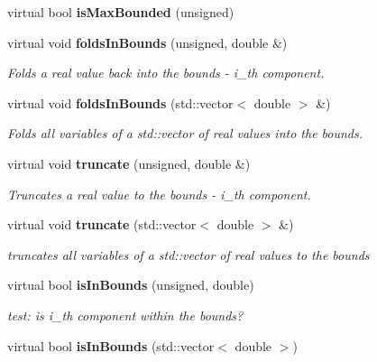 \begin{CompactItemize}
\item 
virtual bool {\bf is\-Max\-Bounded} (unsigned)\label{classeo_real_vector_no_bounds_a7}

\item 
virtual void {\bf folds\-In\-Bounds} (unsigned, double \&)\label{classeo_real_vector_no_bounds_a8}

\begin{CompactList}\small\item\em Folds a real value back into the bounds - i\_\-th component. \item\end{CompactList}\item 
virtual void {\bf folds\-In\-Bounds} (std::vector$<$ double $>$ \&)\label{classeo_real_vector_no_bounds_a9}

\begin{CompactList}\small\item\em Folds all variables of a std::vector of real values into the bounds. \item\end{CompactList}\item 
virtual void {\bf truncate} (unsigned, double \&)\label{classeo_real_vector_no_bounds_a10}

\begin{CompactList}\small\item\em Truncates a real value to the bounds - i\_\-th component. \item\end{CompactList}\item 
virtual void {\bf truncate} (std::vector$<$ double $>$ \&)\label{classeo_real_vector_no_bounds_a11}

\begin{CompactList}\small\item\em truncates all variables of a std::vector of real values to the bounds \item\end{CompactList}\item 
virtual bool {\bf is\-In\-Bounds} (unsigned, double)\label{classeo_real_vector_no_bounds_a12}

\begin{CompactList}\small\item\em test: is i\_\-th component within the bounds? \item\end{CompactList}\item 
virtual bool {\bf is\-In\-Bounds} (std::vector$<$ double $>$)\label{classeo_real_vector_no_bounds_a13}


\end{CompactItemize}
